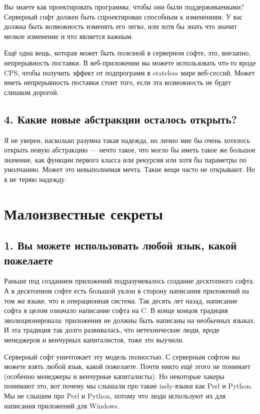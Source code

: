 \documentclass[ebook,12pt,oneside,openany]{memoir}
\begin{document}
Вы знаете как проектировать программы, чтобы они были поддерживаемыми?
Серверный софт должен быть спроектирован способным к изменениям. У вас
должна быть возможность изменять его легко, или хотя бы знать что
значит мелкое изменение и что является важным. \newline

Ещё одна вещь, которая может быть полезной в серверном софте, это,
внезапно, непрерывность поставки. В веб-приложении вы можете
использовать что-то вроде CPS, чтобы получить эффект от подпрограмм в
stateless мире веб-сессий. Может иметь непрерывность поставки стоит
того, если эта возможность не будет слишком дорогой. \newline

\subsection{4. Какие новые абстракции осталось открыть?}

Я не уверен, насколько разумна такая надежда, но лично мне бы очень
хотелось открыть новую абстракцию — нечто такое, что могло бы иметь
такое же большое значение, как функции первого класса или рекурсия или
хотя бы параметры по умолчанию. Может это невыполнимая мечта. Такие
вещи часто не открывают. Но я не теряю надежду. \newline

\section*{Малоизвестные секреты}

\subsection{1. Вы можете использовать любой язык, какой пожелаете}

Раньше под созданием приложений подразумевалось создание десктопного
софта. А в десктопном софте есть большой уклон в сторону написания
приложений на том же языке, что и операционная система. Так десять лет
назад, написание софта в целом означало написание софта на C. В конце
концов традиция эволюционировала: приложения не должны быть написаны
на необычных языках. И эта традиция так долго развивалась, что
нетехнические люди, вроде менеджеров и венчурных капиталистов, тоже
это выучили. \newline

Серверный софт уничтожает эту модель полностью. С серверным софтом вы
можете взять любой язык, какой пожелаете. Почти никто ещё этого не
понимает (особенно менеджеры и венчурные капиталисты). Но некоторые
хакеры понимают это, вот почему мы слышали про такие indy-языки как
Perl и Python. Мы не слышим про Perl и Python, потому что люди
используют их для написания приложений для Windows. \newline
\end{document}
